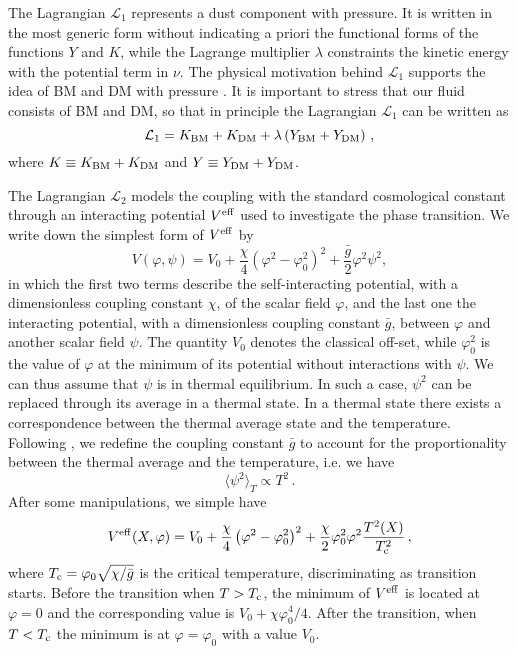 \documentclass[twocolumn,showpacs, nofootinbib,aps,superscriptaddress, eqsecnum,prd,prl,notitlepage,showkeys,10pt,reprint]{revtex4-1}
\begin{document}
The Lagrangian $\mathcal{L}_1$ represents a dust component with pressure.
It is written in the most generic form without indicating a priori the functional forms of the functions $Y$ and $K$, while the Lagrange multiplier $\lambda$ constraints the kinetic energy with the potential term in $\nu$. The physical motivation behind $\mathcal{L}_1$ supports the idea of BM and DM with pressure \cite{2000ApJ...535L..21M,2006MNRAS.372..136F,2017arXiv170701059S,bet}.
It is important to stress that our fluid consists of BM and DM, so that in principle the Lagrangian $\mathcal{L}_1$ can be written as
%
\begin{equation}
\label{BM+DM}
\mathcal{L}_1=K_{\rm BM}+ K_{\rm DM} + \lambda \left(Y_{\rm BM} + Y_{\rm DM}\right)\,,
\end{equation}
%
where $K\equiv K_{\rm BM}+K_{\rm DM}$ and $Y\equiv Y_{\rm DM}+Y_{\rm DM}$.

The Lagrangian $\mathcal{L}_2$ models the coupling with the standard cosmological constant through an interacting potential $V^{\rm eff}$ used to investigate the phase transition. We write down the simplest form of $V^{\rm eff}$ by
%
\begin{equation}
\label{eq:vint}
V(\varphi,\psi)=V_0+\frac{\chi}{4}\left(\varphi^2-\varphi^2_0\right)^2+\frac{\bar{g}}{2}\varphi^2\psi^2,
\end{equation}
%
in which the first two terms describe the self-interacting potential, with a dimensionless coupling constant $\chi$, of the scalar field $\varphi$, and the last one the interacting potential, with a dimensionless coupling constant $\bar{g}$, between $\varphi$ and another scalar field $\psi$.
The quantity $V_0$ denotes
the classical off-set, while $\varphi^2_0$ is the value of $\varphi$ at the minimum of its potential without interactions with $\psi$.
We can thus assume that $\psi$ is in thermal equilibrium. In such a case, $\psi^2$ can be replaced through its average in a thermal state. In a thermal state there exists a correspondence between the thermal average state and the temperature. Following \cite{2006ftft.book.....K}, we redefine the coupling constant $\bar{g}$ to account for the proportionality between the thermal average and the temperature, i.e. we have
$$\langle\psi^2\rangle_{T}\propto T^2\,.$$
After some manipulations, we simple have
%
\begin{equation}
\label{eq:pottemperature}
V^{\rm eff}(X,\varphi)=V_0+\frac{\chi}{4}\left(\varphi^2-\varphi_0^2\right)^2+\frac{\chi}{2}\varphi_0^2\varphi^2
\frac{T^2(X)}{T_{\rm c}^2}\,,
\end{equation}
%
where $T_{\rm c}=\varphi_0\sqrt{\chi/\bar{g}}$ is the critical temperature, discriminating as transition starts. Before the transition when $T>T_{\rm c}$, the minimum of $V^{\rm eff}$ is located at $\varphi=0$ and the corresponding value is $V_0+\chi \varphi_0^4/4$.
After the transition, when $T<T_{\rm c}$ the minimum is  at $\varphi=\varphi_0$ with a value $V_0$.
\end{document}
